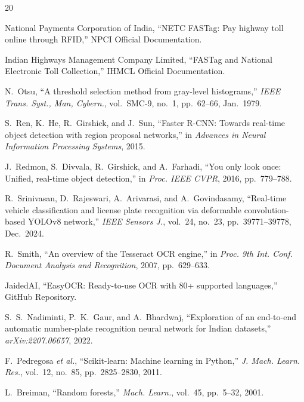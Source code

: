 \documentclass[conference]{IEEEtran}
\begin{document}
\balance

\begin{thebibliography}{20}

National Payments Corporation of India,
``NETC FASTag: Pay highway toll online through RFID,''
NPCI Official Documentation.

Indian Highways Management Company Limited,
``FASTag and National Electronic Toll Collection,''
IHMCL Official Documentation.

N.~Otsu,
``A threshold selection method from gray-level histograms,''
\textit{IEEE Trans. Syst., Man, Cybern.}, vol.~SMC-9, no.~1,
pp.~62--66, Jan.\ 1979.

S.~Ren, K.~He, R.~Girshick, and J.~Sun,
``Faster R-CNN: Towards real-time object detection with region
proposal networks,''
in \textit{Advances in Neural Information Processing Systems},
2015.

J.~Redmon, S.~Divvala, R.~Girshick, and A.~Farhadi,
``You only look once: Unified, real-time object detection,''
in \textit{Proc. IEEE CVPR}, 2016, pp.~779--788.

R.~Srinivasan, D.~Rajeswari, A.~Arivarasi, and A.~Govindasamy,
``Real-time vehicle classification and license plate recognition
via deformable convolution-based YOLOv8 network,''
\textit{IEEE Sensors J.}, vol.~24, no.~23,
pp.~39771--39778, Dec.\ 2024.

R.~Smith,
``An overview of the Tesseract OCR engine,''
in \textit{Proc. 9th Int. Conf. Document Analysis and
Recognition}, 2007, pp.~629--633.

JaidedAI,
``EasyOCR: Ready-to-use OCR with 80+ supported languages,''
GitHub Repository.

S.~S.~Nadiminti, P.~K.~Gaur, and A.~Bhardwaj,
``Exploration of an end-to-end automatic number-plate recognition
neural network for Indian datasets,''
\textit{arXiv:2207.06657}, 2022.

F.~Pedregosa \textit{et al.},
``Scikit-learn: Machine learning in Python,''
\textit{J. Mach. Learn. Res.}, vol.~12, no.~85,
pp.~2825--2830, 2011.

L.~Breiman,
``Random forests,''
\textit{Mach. Learn.}, vol.~45, pp.~5--32, 2001.


\end{thebibliography}
\end{document}
